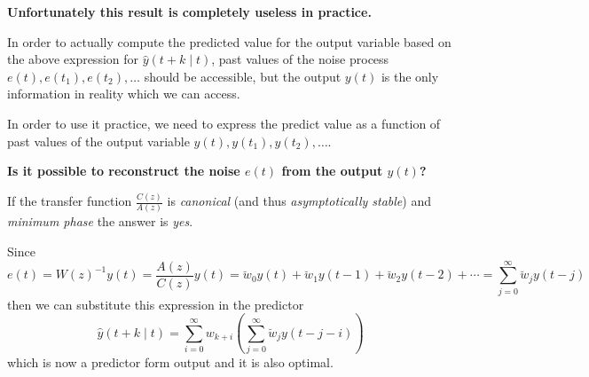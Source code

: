 \textbf{Unfortunately this result is completely useless in practice.}

In order to actually compute the predicted value for the output variable based on the above expression for $\hat{y}(t+k \mid t)$, past values of the noise process $e(t),e(t_1),e(t_2),\ldots$ should be accessible, but the output $y(t)$ is the only information in reality which we can access.

In order to use it practice, we need to express the predict value as a function of past values of the output variable $y(t), y(t_1), y(t_2),\ldots$.

\textbf{Is it possible to reconstruct the noise $e(t)$ from the output $y(t)$?}

If the transfer function $\frac{C(z)}{A(z)}$ is \emph{canonical} (and thus \emph{asymptotically stable}) and \emph{minimum phase} the answer is \emph{yes}.

Since
\begin{equation}\label{eq:reconstruction-noise-from-data}
	e(t)=W(z)^{-1} y(t)=\frac{A(z)}{C(z)} y(t)=\breve{w}_{0} y(t)+\breve{w}_{1} y(t-1)+\breve{w}_{2} y(t-2)+\cdots = \sum_{j=0}^{\infty} \breve{w}_{j}y(t-j)
\end{equation}
then we can substitute this expression in the predictor
\[
	\boxed{\hat{y}(t+k \mid t)=\sum_{i=0}^{\infty} w_{k+i}\left(\sum_{j=0}^{\infty} \breve{w}_{j}y(t-j-i)\right)}
\]
which is now a predictor form output and it is also optimal.

